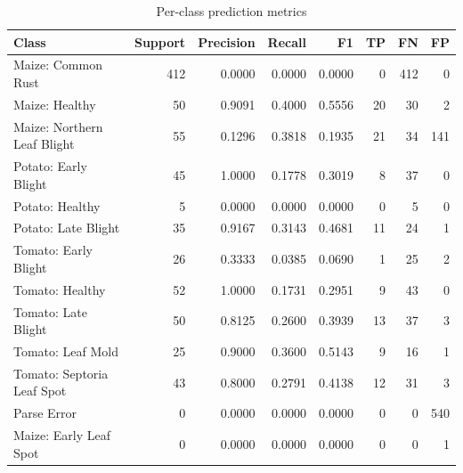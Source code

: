 \documentclass{article}
\begin{document}
\begin{table}[htbp]
  \centering
  \caption{Per-class prediction metrics}
  \label{tab:per_class_metrics}
  \begin{tabular}{lrrrrrrr}
    \toprule
    \textbf{Class} & \textbf{Support} & \textbf{Precision} & \textbf{Recall} & \textbf{F1} & \textbf{TP} & \textbf{FN} & \textbf{FP} \\
    \midrule
    Maize: Common Rust & 412 & 0.0000 & 0.0000 & 0.0000 & 0 & 412 & 0 \\
    Maize: Healthy & 50 & 0.9091 & 0.4000 & 0.5556 & 20 & 30 & 2 \\
    Maize: Northern Leaf Blight & 55 & 0.1296 & 0.3818 & 0.1935 & 21 & 34 & 141 \\
    Potato: Early Blight & 45 & 1.0000 & 0.1778 & 0.3019 & 8 & 37 & 0 \\
    Potato: Healthy & 5 & 0.0000 & 0.0000 & 0.0000 & 0 & 5 & 0 \\
    Potato: Late Blight & 35 & 0.9167 & 0.3143 & 0.4681 & 11 & 24 & 1 \\
    Tomato: Early Blight & 26 & 0.3333 & 0.0385 & 0.0690 & 1 & 25 & 2 \\
    Tomato: Healthy & 52 & 1.0000 & 0.1731 & 0.2951 & 9 & 43 & 0 \\
    Tomato: Late Blight & 50 & 0.8125 & 0.2600 & 0.3939 & 13 & 37 & 3 \\
    Tomato: Leaf Mold & 25 & 0.9000 & 0.3600 & 0.5143 & 9 & 16 & 1 \\
    Tomato: Septoria Leaf Spot & 43 & 0.8000 & 0.2791 & 0.4138 & 12 & 31 & 3 \\
    Parse Error & 0 & 0.0000 & 0.0000 & 0.0000 & 0 & 0 & 540 \\
    Maize: Early Leaf Spot & 0 & 0.0000 & 0.0000 & 0.0000 & 0 & 0 & 1 \\
    \bottomrule
  \end{tabular}
\end{table}
\end{document}
